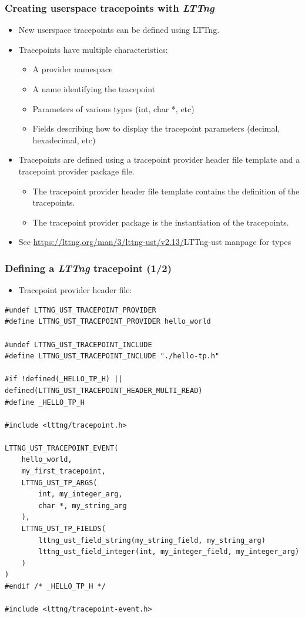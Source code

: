 \begin{frame}
  \frametitle{Creating userspace tracepoints with {\em LTTng}}
  \begin{itemize}
    \item New userspace tracepoints can be defined using LTTng.
    \item Tracepoints have multiple characteristics:
    \begin{itemize}
      \item A provider namespace
      \item A name identifying the tracepoint
      \item Parameters of various types (int, char *, etc)
      \item Fields describing how to display the tracepoint parameters
            (decimal, hexadecimal, etc)
    \end{itemize}
    \item Tracepoints are defined using a tracepoint provider header file
          template and a tracepoint provider package file.
    \begin{itemize}
      \item The tracepoint provider header file template contains the definition
            of the tracepoints.
      \item The tracepoint provider package is the instantiation of the
            tracepoints.
    \end{itemize}
    \item See \url{https://lttng.org/man/3/lttng-ust/v2.13/}{LTTng-ust} manpage
          for types
  \end{itemize}
\end{frame}

\begin{frame}[fragile]
  \frametitle{Defining a {\em LTTng} tracepoint (1/2)}

  \begin{itemize}
    \item Tracepoint provider header file:
  \end{itemize}
  \begin{block}{}
    \begin{verbatim}
#undef LTTNG_UST_TRACEPOINT_PROVIDER
#define LTTNG_UST_TRACEPOINT_PROVIDER hello_world

#undef LTTNG_UST_TRACEPOINT_INCLUDE
#define LTTNG_UST_TRACEPOINT_INCLUDE "./hello-tp.h"

#if !defined(_HELLO_TP_H) || defined(LTTNG_UST_TRACEPOINT_HEADER_MULTI_READ)
#define _HELLO_TP_H

#include <lttng/tracepoint.h>

LTTNG_UST_TRACEPOINT_EVENT(
    hello_world,
    my_first_tracepoint,
    LTTNG_UST_TP_ARGS(
        int, my_integer_arg,
        char *, my_string_arg
    ),
    LTTNG_UST_TP_FIELDS(
        lttng_ust_field_string(my_string_field, my_string_arg)
        lttng_ust_field_integer(int, my_integer_field, my_integer_arg)
    )
)
#endif /* _HELLO_TP_H */

#include <lttng/tracepoint-event.h>
   \end{verbatim}
  \end{block}
\end{frame}

